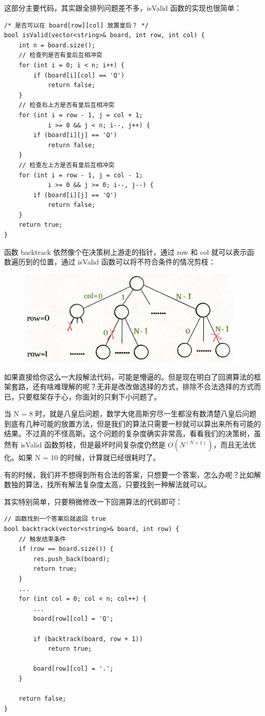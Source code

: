 \documentclass[12pt]{article}
\begin{document}
这部分主要代码，其实跟全排列问题差不多，isValid 函数的实现也很简单：
\begin{lstlisting}
/* 是否可以在 board[row][col] 放置皇后？ */
bool isValid(vector<string>& board, int row, int col) {
    int n = board.size();
    // 检查列是否有皇后互相冲突
    for (int i = 0; i < n; i++) {
        if (board[i][col] == 'Q')
            return false;
    }
    // 检查右上方是否有皇后互相冲突
    for (int i = row - 1, j = col + 1; 
            i >= 0 && j < n; i--, j++) {
        if (board[i][j] == 'Q')
            return false;
    }
    // 检查左上方是否有皇后互相冲突
    for (int i = row - 1, j = col - 1;
            i >= 0 && j >= 0; i--, j--) {
        if (board[i][j] == 'Q')
            return false;
    }
    return true;
}
\end{lstlisting}

函数 backtrack 依然像个在决策树上游走的指针，通过 row 和 col 就可以表示函数遍历到的位置，通过 isValid 函数可以将不符合条件的情况剪枝：
\begin{figure}[H]
    \centering
    \includegraphics[width=.5\textwidth]{fig/Backtrack_7.png}
\end{figure}

如果直接给你这么一大段解法代码，可能是懵逼的。但是现在明白了回溯算法的框架套路，还有啥难理解的呢？无非是改改做选择的方式，排除不合法选择的方式而已，只要框架存于心，你面对的只剩下小问题了。

当 N = 8 时，就是八皇后问题，数学大佬高斯穷尽一生都没有数清楚八皇后问题到底有几种可能的放置方法，但是我们的算法只需要一秒就可以算出来所有可能的结果。不过真的不怪高斯。这个问题的复杂度确实非常高，看看我们的决策树，虽然有 isValid 函数剪枝，但是最坏时间复杂度仍然是 $O(N^(N+1))$，而且无法优化。如果 N = 10 的时候，计算就已经很耗时了。

有的时候，我们并不想得到所有合法的答案，只想要一个答案，怎么办呢？比如解数独的算法，找所有解法复杂度太高，只要找到一种解法就可以。

其实特别简单，只要稍微修改一下回溯算法的代码即可：
\begin{lstlisting}
// 函数找到一个答案后就返回 true
bool backtrack(vector<string>& board, int row) {
    // 触发结束条件
    if (row == board.size()) {
        res.push_back(board);
        return true;
    }
    ...
    for (int col = 0; col < n; col++) {
        ...
        board[row][col] = 'Q';

        if (backtrack(board, row + 1))
            return true;
        
        board[row][col] = '.';
    }

    return false;
}
\end{lstlisting}
\end{document}
